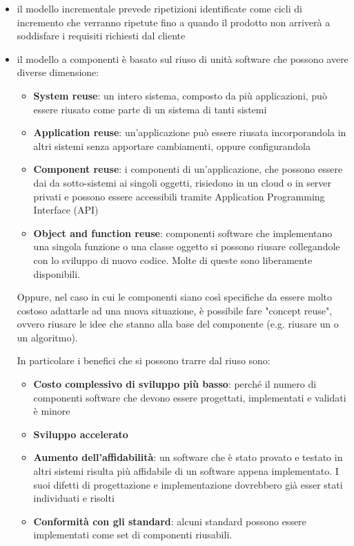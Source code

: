 	\begin{itemize}
		\item il modello incrementale prevede ripetizioni identificate come cicli di incremento che verranno ripetute fino a quando il prodotto non arriverà a soddisfare i requisiti richiesti dal cliente
		\item il modello a componenti è basato sul riuso di unità software che possono avere diverse dimensione:
		\begin{itemize}
			\item \textbf{System reuse}: un intero sistema, composto da più applicazioni, può essere riusato come parte di un sistema di tanti sistemi
			\item \textbf{Application reuse}: un'applicazione può essere riusata incorporandola in altri sistemi senza apportare cambiamenti, oppure configurandola
			\item \textbf{Component reuse}: i componenti di un'applicazione, che possono essere dai da sotto-sistemi ai singoli oggetti, risiedono in un cloud o in server privati e possono essere accessibili tramite Application Programming Interface (API)
			\item \textbf{Object and function reuse}: componenti software che implementano una singola funzione o una classe oggetto si possono riusare collegandole con lo sviluppo di nuovo codice. Molte di queste sono liberamente disponibili. 
		\end{itemize}
		Oppure, nel caso in cui le componenti siano così specifiche da essere molto costoso adattarle ad una nuova situazione, è possibile fare "concept reuse", ovvero riusare le idee che stanno alla base del componente (e.g. riusare un  o un algoritmo). \par
		In particolare i benefici che si possono trarre dal riuso sono:
		\begin{itemize}
			\item \textbf{Costo complessivo di sviluppo più basso}: perché il numero di componenti software che devono essere progettati, implementati e validati è minore
			\item \textbf{Sviluppo accelerato}
			\item \textbf{Aumento dell'affidabilità}: un software che è stato provato e testato in altri sistemi risulta più affidabile di un software appena implementato. I suoi difetti di progettazione e implementazione dovrebbero già esser stati individuati e risolti
			\item \textbf{Conformità con gli standard}: alcuni standard
			possono essere implementati come set di componenti riusabili.
		\end{itemize}
	\end{itemize}
